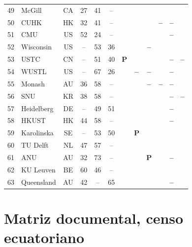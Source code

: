 \documentclass[pdflatex,sn-basic,Numbered,iicol]{sn-jnl}
\newcommand{\si}{\ding{51}}
\newcommand{\no}{\textcolor{gris}{\textbf{--}}}
\newcommand{\pc}{\textbf{P}}
\theoremstyle{thmstyleone}
\theoremstyle{thmstyletwo}
\theoremstyle{thmstylethree}
\begin{document}
\begin{appendices}
\begin{longtable}{@{}r l c c c c c c c c c c@{}}
	49 & McGill & CA & 27 & 41 & -- & \si & \si & \si & \si & \si & \si \\
	50 & CUHK & HK & 32 & 41 & -- & \si & \si & \si & \no & \no & \si \\
	51 & CMU & US & 52 & 24 & -- & \si & \si & \si & \si & \no & \si \\
	52 & Wisconsin & US & -- & 53 & 36 & \si & \si & \no & \si & \si & \si \\
	53 & USTC & CN & -- & 51 & 40 & \pc & \si & \si & \si & \no & \no \\
	54 & WUSTL & US & -- & 67 & 26 & \si & \no & \no & \si & \no & \si \\
	55 & Monash & AU & 36 & 58 & -- & \si & \si & \no & \no & \no & \si \\
	56 & SNU & KR & 38 & 58 & -- & \si & \si & \si & \si & \no & \no \\
	57 & Heidelberg & DE & -- & 49 & 51 & \si & \si & \si & \si & \no & \si \\
	58 & HKUST & HK & 44 & 58 & -- & \si & \si & \si & \si & \no & \si \\
	59 & Karolinska & SE & -- & 53 & 50 & \si & \pc & \si & \si & \si & \si \\
	60 & TU Delft & NL & 47 & 57 & -- & \si & \si & \si & \si & \si & \si \\
	61 & ANU & AU & 32 & 73 & -- & \si & \si & \pc & \si & \no & \si \\
	62 & KU Leuven & BE & 60 & 46 & -- & \si & \si & \si & \si & \si & \si \\
	63 & Queensland & AU & 42 & -- & 65 & \si & \si & \si & \si & \no & \si \\
\end{longtable}
\normalsize

\section{Matriz documental, censo ecuatoriano}\label{ap:ecuador}
\setcounter{table}{0}\setcounter{figure}{0}


\end{appendices}
\end{document}
